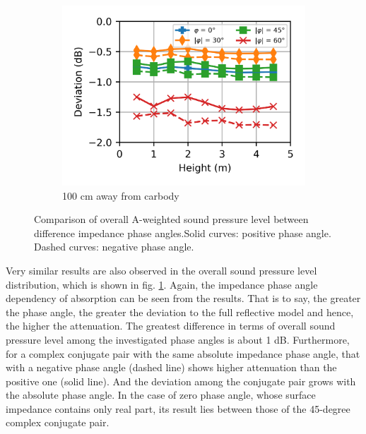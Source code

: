 \begin{figure}[H]
\begin{subfigure}[b]{\textwidth}
		\includegraphics{fig/chap5/impedance/overall_SPL/deviation_pos_g.png}
		\caption{100 cm away from carbody}
	\end{subfigure}
	
	\caption{Comparison of overall A-weighted sound pressure level between difference impedance phase angles.Solid curves: positive phase angle. Dashed curves: negative phase angle.}
	\label{fig:overall_SPL_impedance}
\end{figure}

\noindent Very similar results are also observed in the overall sound pressure level distribution, which is shown in fig. \ref{fig:overall_SPL_impedance}. Again, the impedance phase angle dependency of absorption can be seen from the results. That is to say, the greater the phase angle, the greater the deviation to the full reflective model and hence, the higher the attenuation. The greatest difference in terms of overall sound pressure level among the investigated phase angles is about 1 dB. Furthermore, for a complex conjugate pair with the same absolute impedance phase angle, that with a negative phase angle (dashed line) shows higher attenuation than the positive one (solid line). And the deviation among the conjugate pair grows with the absolute phase angle. In the case of zero phase angle, whose surface impedance contains only real part, its result lies between those of the 45-degree complex conjugate pair.


